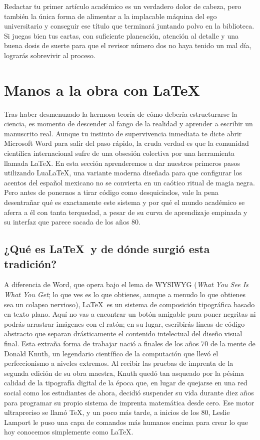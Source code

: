 Redactar tu primer artículo académico es un verdadero dolor de cabeza, pero también la única forma de alimentar a la implacable máquina del ego universitario y conseguir ese título que terminará juntando polvo en la biblioteca.
Si juegas bien tus cartas, con suficiente planeación, atención al detalle y una buena dosis de suerte para que el revisor número dos no haya tenido un mal día, lograrás sobrevivir al proceso.

\section{Manos a la obra con \LaTeX}
\label{sec:manos_a_la_obra_latex}

Tras haber desmenuzado la hermosa teoría de cómo debería estructurarse la ciencia, es momento de descender al fango de la realidad y aprender a escribir un manuscrito real.
Aunque tu instinto de supervivencia inmediata te dicte abrir Microsoft Word para salir del paso rápido, la cruda verdad es que la comunidad científica internacional sufre de una obsesión colectiva por una herramienta llamada \LaTeX.
En esta sección aprenderemos a dar nuestros primeros pasos utilizando Lua\LaTeX, una variante moderna diseñada para que configurar los acentos del español mexicano no se convierta en un caótico ritual de magia negra.
Pero antes de ponernos a tirar código como desquiciados, vale la pena desentrañar qué es exactamente este sistema y por qué el mundo académico se aferra a él con tanta terquedad, a pesar de su curva de aprendizaje empinada y su interfaz que parece sacada de los años 80.

\subsection*{¿Qué es \LaTeX\ y de dónde surgió esta tradición?}
\label{sub:que_es_latex_tradicion}

A diferencia de Word, que opera bajo el lema de WYSIWYG (\emph{What You See Is What You Get}; lo que ves es lo que obtienes, aunque a menudo lo que obtienes sea un colapso nervioso), \LaTeX\ es un sistema de composición tipográfica basado en texto plano.
Aquí no vas a encontrar un botón amigable para poner negritas ni podrás arrastrar imágenes con el ratón; en su lugar, escribirás líneas de código abstracto que separan drásticamente el contenido intelectual del diseño visual final.
Esta extraña forma de trabajar nació a finales de los años 70 de la mente de Donald Knuth, un legendario científico de la computación que llevó el perfeccionismo a niveles extremos.
Al recibir las pruebas de imprenta de la segunda edición de su obra maestra, Knuth quedó tan asqueado por la pésima calidad de la tipografía digital de la época que, en lugar de quejarse en una red social como los estudiantes de ahora, decidió suspender su vida durante diez años para programar su propio sistema de imprenta matemática desde cero.
Ese motor ultrapreciso se llamó \TeX, y un poco más tarde, a inicios de los 80, Leslie Lamport le puso una capa de comandos más humanos encima para crear lo que hoy conocemos simplemente como \LaTeX.

